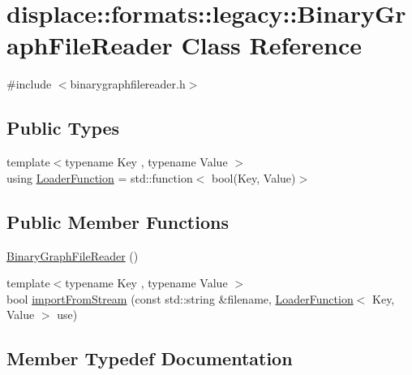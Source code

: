 \hypertarget{classdisplace_1_1formats_1_1legacy_1_1_binary_graph_file_reader}{}\section{displace\+::formats\+::legacy\+::Binary\+Graph\+File\+Reader Class Reference}
\label{classdisplace_1_1formats_1_1legacy_1_1_binary_graph_file_reader}


{\ttfamily \#include $<$binarygraphfilereader.\+h$>$}

\subsection*{Public Types}
\begin{DoxyCompactItemize}
\item 
{\footnotesize template$<$typename Key , typename Value $>$ }\\using \mbox{\hyperlink{classdisplace_1_1formats_1_1legacy_1_1_binary_graph_file_reader_aa2ff0e1281c7a9d96e19c0b1f821161c}{Loader\+Function}} = std\+::function$<$ bool(Key, Value)$>$
\end{DoxyCompactItemize}
\subsection*{Public Member Functions}
\begin{DoxyCompactItemize}
\item 
\mbox{\hyperlink{classdisplace_1_1formats_1_1legacy_1_1_binary_graph_file_reader_a78d6758fe79e23652e22e85595b0b282}{Binary\+Graph\+File\+Reader}} ()
\item 
{\footnotesize template$<$typename Key , typename Value $>$ }\\bool \mbox{\hyperlink{classdisplace_1_1formats_1_1legacy_1_1_binary_graph_file_reader_a67c9fccfcb8e163095484972841e3d43}{import\+From\+Stream}} (const std\+::string \&filename, \mbox{\hyperlink{classdisplace_1_1formats_1_1legacy_1_1_binary_graph_file_reader_aa2ff0e1281c7a9d96e19c0b1f821161c}{Loader\+Function}}$<$ Key, Value $>$ use)
\end{DoxyCompactItemize}


\subsection{Member Typedef Documentation}
\mbox{\label{classdisplace_1_1formats_1_1legacy_1_1_binary_graph_file_reader_aa2ff0e1281c7a9d96e19c0b1f821161c}} 
